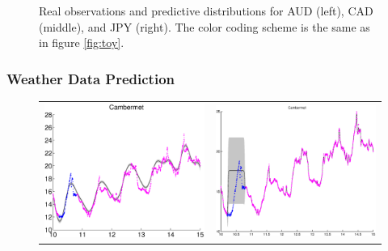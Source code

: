 \begin{figure}
\begin{tabular}{ccc}
\end{tabular}
\caption{Real observations and predictive distributions for AUD (left), CAD (middle), and JPY (right). The color coding scheme is the same as in figure \ref{fig:toy}.}
\label{fig:fx}
\end{figure}

\subsubsection{Weather Data Prediction}

\begin{figure}
\centering
\begin{tabular}{cc}
\includegraphics[scale=0.3]{figures/slfm-weatherCambermet.eps} &
\includegraphics[scale=0.3]{figures/weatherCambermet.eps} \\

\end{tabular}
\end{figure}
